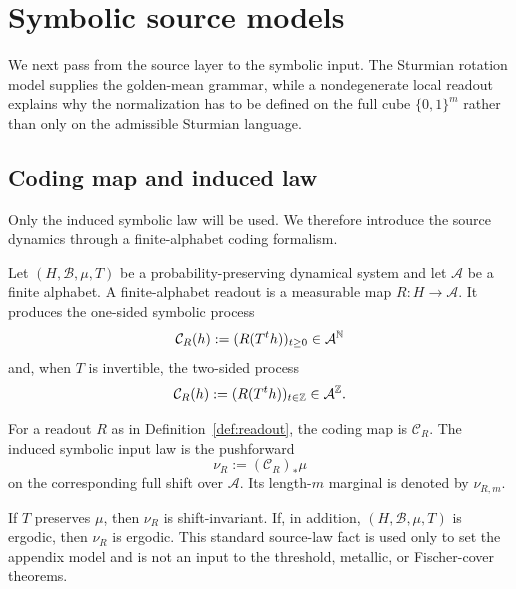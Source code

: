 \section{Symbolic source models}\label{sec:readout}

We next pass from the source layer to the symbolic input. The Sturmian rotation model supplies the golden-mean grammar, while a nondegenerate local readout explains why the normalization has to be defined on the full cube $\{0,1\}^m$ rather than only on the admissible Sturmian language.

\subsection{Coding map and induced law}\label{sec:readout:maps}

Only the induced symbolic law will be used. We therefore introduce the source dynamics through a finite-alphabet coding formalism.

\begin{definition}\label{def:readout}
Let $(H,\mathcal B,\mu,T)$ be a probability-preserving dynamical system and let
$\mathcal A$ be a finite alphabet.  A finite-alphabet readout is a measurable
map $R:H\to\mathcal A$.  It produces the one-sided symbolic process
\[
  \mathcal C_R(h):=(R(T^t h))_{t\ge0}\in\mathcal A^{\mathbb{N}}
\]
and, when $T$ is invertible, the two-sided process
\[
  \mathcal C_R(h):=(R(T^t h))_{t\in\mathbb{Z}}\in\mathcal A^{\mathbb{Z}}.
\]
\end{definition}

\begin{definition}\label{def:coding-law}
For a readout $R$ as in Definition~\ref{def:readout}, the coding map is
$\mathcal C_R$.  The induced symbolic input law is the pushforward
\[
  \nu_R:=(\mathcal C_R)_*\mu
\]
on the corresponding full shift over $\mathcal A$.  Its length-$m$ marginal is
denoted by $\nu_{R,m}$.
\end{definition}

\begin{proposition}\label{prop:induced-law}
If $T$ preserves $\mu$, then $\nu_R$ is shift-invariant.  If, in addition,
$(H,\mathcal B,\mu,T)$ is ergodic, then $\nu_R$ is ergodic.
This standard source-law fact is used only to set the appendix model and is
not an input to the threshold, metallic, or Fischer-cover theorems.
\end{proposition}


